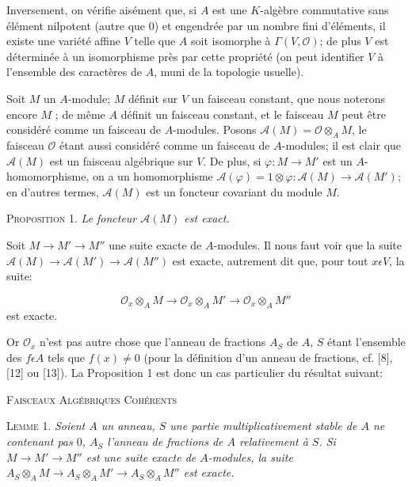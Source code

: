 Inversement, on vérifie aisément que, si $A$ est une $K$-algèbre commutative sans élément nilpotent (autre que 0) et engendrée par un nombre fini d'éléments, il existe une variété affine $V$ telle que $A$ soit isomorphe à $\Gamma(V, \mathcal{O})$; de plus $V$ est déterminée à un isomorphisme près par cette propriété (on peut identifier $V$ à l'ensemble des caractères de $A$, muni de la topologie usuelle).

Soit $M$ un $A$-module; $M$ définit sur $V$ un faisceau constant, que nous noterons encore $M$ ; de même $A$ définit un faisceau constant, et le faisceau $M$ peut être considéré comme un faisceau de $A$-modules. Posons $\mathcal{A}(M) = \mathcal{O} \otimes_A M$, le faisceau $\mathcal{O}$ étant aussi considéré comme un faisceau de $A$-modules; il est clair que $\mathcal{A}(M)$ est un faisceau algébrique sur $V$. De plus, si $\varphi : M \to M'$ est un $A$-homomorphisme, on a un homomorphisme $\mathcal{A}(\varphi) = 1 \otimes \varphi : \mathcal{A}(M) \to \mathcal{A}(M')$; en d'autres termes, $\mathcal{A}(M)$ est un foncteur covariant du module $M$.

\textsc{Proposition} 1. \textit{Le foncteur $\mathcal{A}(M)$ est exact.}

Soit $M \to M' \to M''$ une suite exacte de $A$-modules. Il nous faut voir que la suite $\mathcal{A}(M) \to \mathcal{A}(M') \to \mathcal{A}(M'')$ est exacte, autrement dit que, pour tout $x \epsilon V$, la suite:

\begin{equation*}
\mathcal{O}_x \otimes_A M \to \mathcal{O}_x \otimes_A M' \to \mathcal{O}_x \otimes_A M''
\end{equation*}
est exacte.

Or $\mathcal{O}_x$ n'est pas autre chose que l'anneau de fractions $A_S$ de $A$, $S$ étant l'ensemble des $f \epsilon A$ tels que $f(x) \neq 0$ (pour la définition d'un anneau de fractions, cf. [8], [12] ou [13]). La Proposition 1 est donc un cas particulier du résultat suivant:




\textsc{Faisceaux Algébriques Cohérents}

\textsc{Lemme} 1. \textit{Soient $A$ un anneau, $S$ une partie multiplicativement stable de $A$ ne contenant pas $0$, $A_S$ l'anneau de fractions de $A$ relativement à $S$. Si $M \to M' \to M''$ est une suite exacte de $A$-modules, la suite $A_S \otimes_A M \to A_S \otimes_A M' \to A_S \otimes_A M''$ est exacte.}


